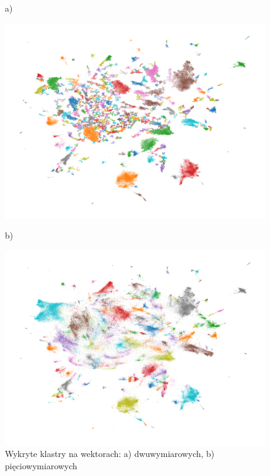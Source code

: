 	\begin{figure}[htb]
		\centering
		\begin{minipage}{.5\textwidth}
			a)\par\medskip %
			\includegraphics[width=\linewidth]{rys04/umap_15_100_1.png}
		\end{minipage}%
		\begin{minipage}{.5\textwidth}
			b)\par\medskip %
			\includegraphics[width=\linewidth]{rys04/umap_15_100_1_5d.png}
		\end{minipage}
		\caption{Wykryte klastry na wektorach: a) dwuwymiarowych, b) pięciowymiarowych}\label{fig:hdbscan} %
	\end{figure}

